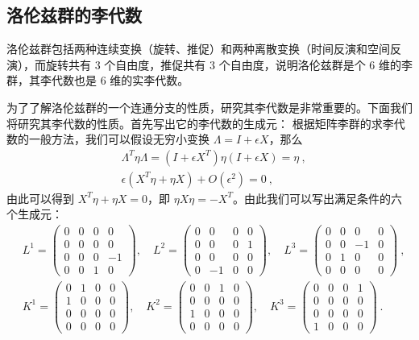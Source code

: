 \subsection{洛伦兹群的李代数}
洛伦兹群包括两种连续变换（旋转、推促）和两种离散变换（时间反演和空间反演），而旋转共有 $3$ 个自由度，推促共有 $3$ 个自由度，说明洛伦兹群是个 $6$ 维的李群，其李代数也是 $6$ 维的实李代数。

为了了解洛伦兹群的一个连通分支的性质，研究其李代数是非常重要的。下面我们将研究其李代数的性质。首先写出它的李代数的生成元：
根据矩阵李群的求李代数的一般方法，我们可以假设无穷小变换 $\Lambda=I+\epsilon X$，那么
\begin{equation}
\begin{aligned}
&\Lambda^T \eta \Lambda = (I+\epsilon X^T)\eta (I+\epsilon X)=\eta~,\\
&\epsilon (X^T \eta + \eta X)+O(\epsilon^2)=0~,
\end{aligned}
\end{equation}
由此可以得到 $X^T\eta+\eta X=0$，即 $\eta X \eta = -X^T$。由此我们可以写出满足条件的六个生成元：
\begin{equation}
\begin{aligned}
&L^1=
\begin{pmatrix}
0 & 0 & 0 & 0\\
0 & 0 & 0 & 0\\
0 & 0 & 0 & -1\\
0 & 0 & 1 & 0
\end{pmatrix}
,\quad
L^2=
\begin{pmatrix}
0 & 0 & 0 & 0\\
0 & 0 & 0 & 1\\
0 & 0 & 0 & 0\\
0 & -1 & 0 & 0
\end{pmatrix}
,\quad
L^3=
\begin{pmatrix}
0 & 0 & 0 & 0\\
0 & 0 & -1 & 0\\
0 & 1 & 0 & 0\\
0 & 0 & 0 & 0
\end{pmatrix}~,\\
& K^1=\begin{pmatrix}
0 & 1 & 0 & 0\\
1 & 0 & 0 & 0\\
0 & 0 & 0 & 0\\
0 & 0 & 0 & 0
\end{pmatrix}
,\quad 
K^2=\begin{pmatrix}
0 & 0 & 1 & 0\\
0 & 0 & 0 & 0\\
1 & 0 & 0 & 0\\
0 & 0 & 0 & 0
\end{pmatrix}
,\quad  K^3=\begin{pmatrix}
0 & 0 & 0 & 1\\
0 & 0 & 0 & 0\\
0 & 0 & 0 & 0\\
1 & 0 & 0 & 0
\end{pmatrix}~.
\end{aligned}
\end{equation}
